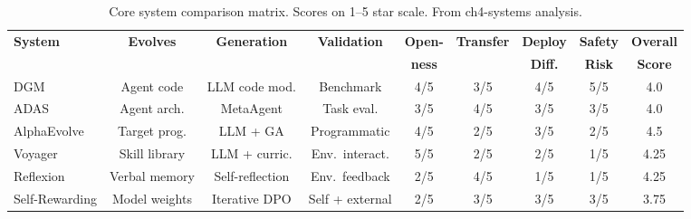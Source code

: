 \begin{table}[t]
\centering
\caption{Core system comparison matrix. Scores on 1--5 star scale. From ch4-systems analysis.}
\label{tab:bench-systems}
\begin{tabular}{@{}lcccccccc@{}}
\toprule
\textbf{System} & \textbf{Evolves} & \textbf{Generation} & \textbf{Validation} & \textbf{Open-} & \textbf{Transfer} & \textbf{Deploy} & \textbf{Safety} & \textbf{Overall} \\
 & & & & \textbf{ness} & & \textbf{Diff.} & \textbf{Risk} & \textbf{Score} \\
\midrule
DGM & Agent code & LLM code mod. & Benchmark & 4/5 & 3/5 & 4/5 & 5/5 & 4.0 \\
ADAS & Agent arch. & MetaAgent & Task eval. & 3/5 & 4/5 & 3/5 & 3/5 & 4.0 \\
AlphaEvolve & Target prog. & LLM + GA & Programmatic & 4/5 & 2/5 & 3/5 & 2/5 & 4.5 \\
Voyager & Skill library & LLM + curric. & Env.\ interact. & 5/5 & 2/5 & 2/5 & 1/5 & 4.25 \\
Reflexion & Verbal memory & Self-reflection & Env.\ feedback & 2/5 & 4/5 & 1/5 & 1/5 & 4.25 \\
Self-Rewarding & Model weights & Iterative DPO & Self + external & 2/5 & 3/5 & 3/5 & 3/5 & 3.75 \\
\bottomrule
\end{tabular}
\end{table}

